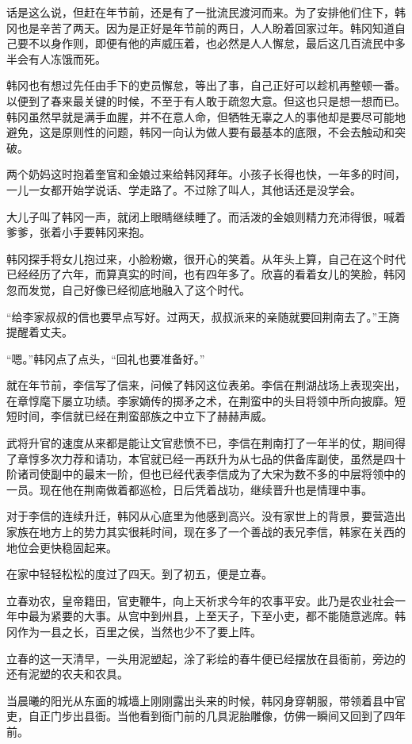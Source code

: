话是这么说，但赶在年节前，还是有了一批流民渡河而来。为了安排他们住下，韩冈也是辛苦了两天。因为是正好是年节前的两日，人人盼着回家过年。韩冈知道自己要不以身作则，即便有他的声威压着，也必然是人人懈怠，最后这几百流民中多半会有人冻饿而死。

韩冈也有想过先任由手下的吏员懈怠，等出了事，自己正好可以趁机再整顿一番。以便到了春来最关键的时候，不至于有人敢于疏忽大意。但这也只是想一想而已。韩冈虽然早就是满手血腥，并不在意人命，但牺牲无辜之人的事他却是要尽可能地避免，这是原则性的问题，韩冈一向认为做人要有最基本的底限，不会去触动和突破。

两个奶妈这时抱着奎官和金娘过来给韩冈拜年。小孩子长得也快，一年多的时间，一儿一女都开始学说话、学走路了。不过除了叫人，其他话还是没学会。

大儿子叫了韩冈一声，就闭上眼睛继续睡了。而活泼的金娘则精力充沛得很，喊着爹爹，张着小手要韩冈来抱。

韩冈探手将女儿抱过来，小脸粉嫩，很开心的笑着。从年头上算，自己在这个时代已经经历了六年，而算真实的时间，也有四年多了。欣喜的看着女儿的笑脸，韩冈忽而发觉，自己好像已经彻底地融入了这个时代。

“给李家叔叔的信也要早点写好。过两天，叔叔派来的亲随就要回荆南去了。”王旖提醒着丈夫。

“嗯。”韩冈点了点头，“回礼也要准备好。”

就在年节前，李信写了信来，问候了韩冈这位表弟。李信在荆湖战场上表现突出，在章惇麾下屡立功绩。李家嫡传的掷矛之术，在荆蛮中的头目将领中所向披靡。短短时间，李信就已经在荆蛮部族之中立下了赫赫声威。

武将升官的速度从来都是能让文官悲愤不已，李信在荆南打了一年半的仗，期间得了章惇多次力荐和请功，本官就已经一再跃升为从七品的供备库副使，虽然是四十阶诸司使副中的最末一阶，但也已经代表李信成为了大宋为数不多的中层将领中的一员。现在他在荆南做着都巡检，日后凭着战功，继续晋升也是情理中事。

对于李信的连续升迁，韩冈从心底里为他感到高兴。没有家世上的背景，要营造出家族在地方上的势力其实很耗时间，现在多了一个善战的表兄李信，韩家在关西的地位会更快稳固起来。

在家中轻轻松松的度过了四天。到了初五，便是立春。

立春劝农，皇帝籍田，官吏鞭牛，向上天祈求今年的农事平安。此乃是农业社会一年中最为紧要的大事。从宫中到州县，上至天子，下至小吏，都不能随意逃席。韩冈作为一县之长，百里之侯，当然也少不了要上阵。

立春的这一天清早，一头用泥塑起，涂了彩绘的春牛便已经摆放在县衙前，旁边的还有泥塑的农夫和农具。

当晨曦的阳光从东面的城墙上刚刚露出头来的时候，韩冈身穿朝服，带领着县中官吏，自正门步出县衙。当他看到衙门前的几具泥胎雕像，仿佛一瞬间又回到了四年前。

